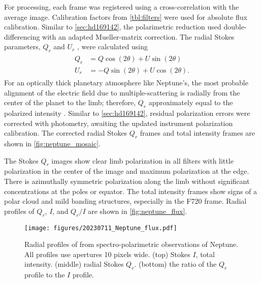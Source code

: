 For processing, each frame was registered using a cross-correlation with the average image. Calibration factors from \autoref{tbl:filters} were used for absolute flux calibration. Similar to \autoref{sec:hd169142}, the polarimetric reduction used double-differencing with an adapted Mueller-matrix correction. The radial Stokes parameters, $Q_r$ and $U_r$ \citep{schmid_limb_2006}, were calculated using
\begin{align}
    \label{eqn:rad_stokes}
\begin{split}
    Q_r &= Q\cos{\left(2\theta\right)} + U\sin{\left(2\theta\right)} \\
    U_r &= -Q\sin{\left(2\theta\right)} + U\cos{\left(2\theta\right)}.
\end{split}
\end{align}
For an optically thick planetary atmosphere like Neptune's, the most probable alignment of the electric field due to multiple-scattering is radially from the center of the planet to the limb; therefore, $Q_r$ approximately equal to the polarized intensity \citep{schmid_limb_2006}. Similar to \autoref{sec:hd169142}, residual polarization errors were corrected with photometry, awaiting the updated instrument polarization calibration. The corrected radial Stokes $Q_r$ frames and total intensity frames are shown in \autoref{fig:neptune_mosaic}.

The Stokes $Q_r$ images show clear limb polarization in all filters with little polarization in the center of the image and maximum polarization at the edge. There is azimuthally symmetric polarization along the limb without significant concentrations at the poles or equator. The total intensity frames show signs of a polar cloud and mild banding structures, especially in the F720 frame. Radial profiles of $Q_r$, $I$, and $Q_r/I$ are shown in \autoref{fig:neptune_flux}.

\begin{figure}
    \centering
    \texttt{[image: figures/20230711\_Neptune\_flux.pdf]}
    \caption{Radial profiles of from spectro-polarimetric observations of Neptune. All profiles use apertures 10 pixels wide. (top) Stokes $I$, total intensity. (middle) radial Stokes $Q_r$. (bottom) the ratio of the $Q_r$ profile to the $I$ profile.\label{fig:neptune_flux}}
\end{figure}
